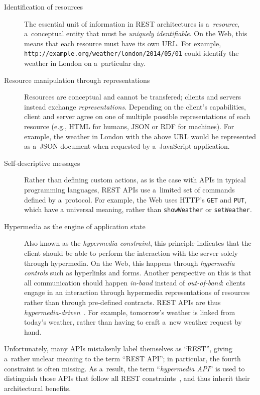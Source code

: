 \begin{description}
  \item[Identification of resources]
  The essential unit of information in REST architectures is a~\emph{resource},
  a~conceptual entity that must be \emph{uniquely identifiable}.
  On the Web, this means that each resource must have its own URL.
  For example, \verb!http://example.org/weather/london/2014/05/01!
  could identify the weather in London on a~particular day.

  \item[Resource manipulation through representations]
  Resources are conceptual and cannot be transfered;
  clients and servers instead exchange \emph{representations}.
  Depending on the client's capabilities,
  client and server agree on one of multiple possible representations of each resource
  (e.g., HTML for humans, JSON or RDF for machines).
  For example, the weather in London with the above URL
  would be represented as a~JSON document
  when requested by a~JavaScript application.

  \item[Self-descriptive messages]
  Rather than defining custom actions,
  as is the case with APIs in typical programming languages,
  REST APIs use a~limited set of commands defined by a~protocol.
  For example, the Web uses HTTP's \verb!GET! and \verb!PUT!,
  which have a universal meaning,
  rather than \verb!showWeather! or \verb!setWeather!.

  \item[Hypermedia as the engine of application state]
  Also known as the \emph{hypermedia constraint},
  this principle indicates that the client should be able
  to perform the interaction with the server solely through hypermedia.
  On the Web, this happens through \emph{hypermedia controls}
  such as hyperlinks and forms.
  Another perspective on this is that all communication should happen \emph{in-band}
  instead of \emph{out-of-band}:
  clients engage in an interaction through hypermedia representations of resources
  rather than through pre-defined contracts.
  REST APIs are thus \emph{hypermedia-driven}~\cite{fielding_2008}.
  For example, tomorrow's weather is linked from today's weather,
  rather than having to craft a~new weather request by hand.
\end{description}

Unfortunately, many APIs mistakenly label themselves as \enquote{REST},
giving a~rather unclear meaning to the term \enquote{REST API};
in particular, the fourth constraint is often missing.
As a~result, the term \enquote{\emph{hypermedia API}} is used
to distinguish those APIs that follow all REST constraints~\cite{RESTfulWebApis},
and thus inherit their architectural benefits.

